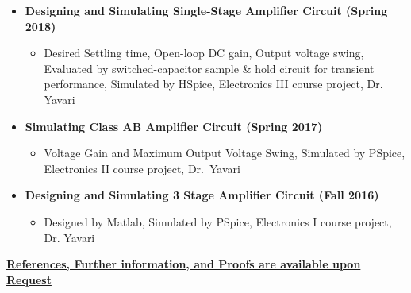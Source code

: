 \begin{itemize}
		\vspace{+1 em}
	\item \textbf{Designing and Simulating Single-Stage Amplifier Circuit (Spring 2018)}
		\begin{itemize}
			\item Desired Settling time, Open-loop DC gain, Output voltage swing, Evaluated by switched-capacitor sample \& hold circuit for transient performance, Simulated by HSpice, Electronics III course project, Dr. Yavari
		\end{itemize}

	\vspace{+1 em}
	\item \textbf{Simulating Class AB Amplifier Circuit (Spring 2017)} 
		\begin{itemize}
			\item Voltage Gain and Maximum Output Voltage Swing, Simulated by PSpice, Electronics II course
project, \mbox{Dr. Yavari}
		\end{itemize}

			\vspace{+1 em}
	\item \textbf{Designing and Simulating 3 Stage Amplifier Circuit (Fall 2016)}
		\begin{itemize}
			\item Designed by Matlab, Simulated by PSpice, Electronics I course project, Dr. Yavari
		\end{itemize}
\end{itemize}

\vspace{+1 em}
\centerline{\underline{\textbf{	\faExclamationCircle \hspace{0.5 pt} References, Further information, and Proofs are available upon Request}}}
